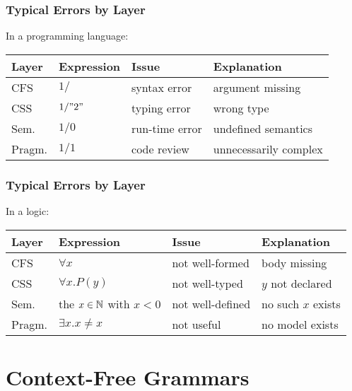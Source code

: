 \begin{frame}\frametitle{Typical Errors by Layer}
In a programming language:

\begin{center}
\begin{tabular}{l|lll}
Layer & Expression & Issue & Explanation \\\hline
CFS & $1/$ & syntax error & argument missing\\
CSS & $1/"2"$ & typing error & wrong type\\
Sem. & $1/0$ & run-time error & undefined semantics \\
Pragm. & $1/1$ & code review & unnecessarily complex\\
\end{tabular}
\end{center}
\end{frame}

\begin{frame}\frametitle{Typical Errors by Layer}
In a logic:

\begin{center}
\begin{tabular}{l|lll}
Layer & Expression & Issue & Explanation \\\hline
CFS & $\forall x$ & not well-formed & body missing\\
CSS & $\forall x.P(y)$ & not well-typed & $y$ not declared\\
Sem. & the $x\in \mathbb{N}$ with $x<0$ & not well-defined & no such $x$ exists \\
Pragm. & $\exists x.x\neq x$ & not useful & no model exists\\
\end{tabular}
\end{center}
\end{frame}

\section{Context-Free Grammars}

